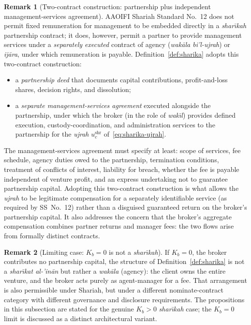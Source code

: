 \documentclass[preprint,12pt,authoryear]{elsarticle}
\theoremstyle{definition}
\newtheorem{remark}{Remark}[section]
\begin{document}
\begin{remark}[Two-contract construction: partnership plus
    independent management-services agreement]
\label{rem:sharika-two-contracts}
AAOIFI Shariah Standard No.~12 does not permit fixed remuneration
for management to be embedded directly in a
\emph{shar\={\i}kah} partnership contract; it does, however,
permit a partner to provide management services under a
\emph{separately executed} contract of agency
(\emph{wak\={a}la bi'l-ujrah}) or \emph{ij\={a}ra}, under which
remuneration is payable. Definition~\ref{def:sharika} adopts this
two-contract construction:
\begin{itemize}
    \item[(a)] a \emph{partnership deed} that documents capital
    contributions, profit-and-loss shares, decision rights, and
    dissolution;
    \item[(b)] a \emph{separate management-services agreement}
    executed alongside the partnership, under which the broker
    (in the role of \emph{wak\={\i}l}) provides defined
    execution, custody-coordination, and administration services
    to the partnership for the \emph{ujrah}
    $u^{\text{shr}}_c$ of~\eqref{eq:sharika-ujrah}.
\end{itemize}
The management-services agreement must specify at least: scope
of services, fee schedule, agency duties owed to the
partnership, termination conditions, treatment of conflicts of
interest, liability for breach, whether the fee is payable
independent of venture profit, and an express undertaking not to
guarantee partnership capital. Adopting this two-contract
construction is what allows the \emph{ujrah} to be legitimate
compensation for a separately identifiable service (as required
by SS~No.~12) rather than a disguised guaranteed return on the
broker's partnership capital. It also addresses the concern that
the broker's aggregate compensation combines partner returns and
manager fees: the two flows arise from formally distinct
contracts.
\end{remark}

\begin{remark}[Limiting case: $K_b = 0$ is not a
    \emph{shar\={\i}kah}]
\label{rem:sharika-limit-wakala}
If $K_b = 0$, the broker contributes no partnership capital,
the structure of Definition~\ref{def:sharika} is not a
\emph{shar\={\i}kat al-'in\={a}n} but rather a \emph{wak\={a}la}
(agency): the client owns the entire venture, and the broker
acts purely as agent-manager for a fee. That arrangement is
also permissible under Shariah, but under a different
nominate-contract category with different governance and
disclosure requirements. The propositions in this subsection
are stated for the genuine $K_b > 0$ \emph{shar\={\i}kah} case;
the $K_b = 0$ limit is discussed as a distinct architectural
variant.
\end{remark}
\end{document}
